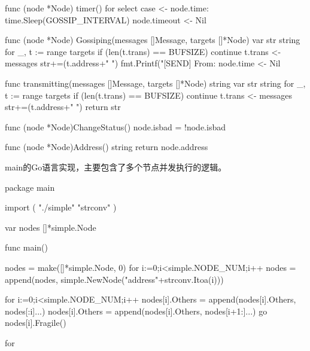 \begin{codeblock}[language=GO]
	func (node *Node) timer() {
		for {
			select {
			case <- node.time:
				time.Sleep(GOSSIP_INTERVAL)
				node.timeout <- Nil{}
			}
		}
	}
	
	func (node *Node) Gossiping(messages []Message, targets []*Node) {
		var str string
		for _, t := range targets {
			if (len(t.trans) == BUFSIZE) {
				continue
			}
			t.trans <- messages
			str+=(t.address+" ")
		}
		fmt.Printf("[SEND] From: %
		node.time <- Nil{}
	}
	
	func transmitting(messages []Message, targets []*Node) string {
		var str string
		for _, t := range targets {
			if (len(t.trans) == BUFSIZE) {
				continue
			}
			t.trans <- messages
			str+=(t.address+" ")
		}
		return str
	}
	
	func (node *Node)ChangeStatus() {
		node.isbad = !node.isbad
	}
	
	func (node *Node)Address() string {
		return node.address
	}
\end{codeblock}

main的Go语言实现，主要包含了多个节点并发执行的逻辑。
\begin{codeblock}[language=GO]
	package main

	import (
		"./simple"
		"strconv"
	)
	
	var nodes []*simple.Node
	
	func main() {
		nodes = make([]*simple.Node, 0)
		for i:=0;i<simple.NODE_NUM;i++ {
			nodes = append(nodes, simple.NewNode("address"+strconv.Itoa(i)))
		}
	
		for i:=0;i<simple.NODE_NUM;i++ {
			nodes[i].Others = append(nodes[i].Others, nodes[:i]...)
			nodes[i].Others = append(nodes[i].Others, nodes[i+1:]...)
			go nodes[i].Fragile()
		}
	
		for {
		}
	}
\end{codeblock}

